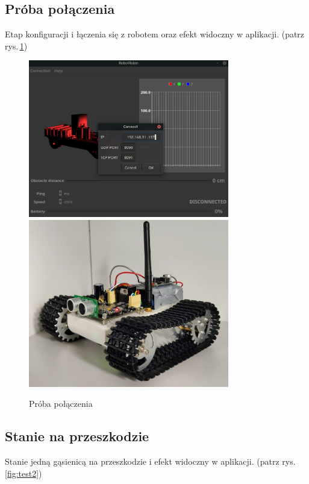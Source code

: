 \documentclass[12pt,a4paper,polish]{article}
\begin{document}
  \subsection{Próba połączenia}
  Etap konfiguracji i łączenia się z robotem oraz efekt widoczny w aplikacji. 
  (patrz rys.\,\ref{fig:test1})

  \begin{figure}[ht]
    \centering
    \includegraphics[width=0.78\textwidth]{img/final/0.png}
    \includegraphics[width=0.78\textwidth]{img/final/0e.jpg}
    \caption{Próba połączenia}
    \label{fig:test1}
  \end{figure}


  \subsection{Stanie na przeszkodzie}
  Stanie jedną gąsienicą na przeszkodzie i efekt widoczny w aplikacji.
  (patrz rys.\,\ref{fig:test2})
  
\end{document}
